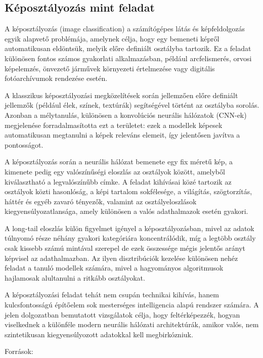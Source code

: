         \subsection{Képosztályozás mint feladat}
            A képosztályozás (image classification) a számítógépes látás és képfeldolgozás egyik alapvető problémája, amelynek célja, hogy egy bemeneti képről automatikusan eldöntsük, melyik előre definiált osztályba tartozik. Ez a feladat különösen fontos számos gyakorlati alkalmazásban, például arcfelismerés, orvosi képelemzés, önvezető járművek környezeti értelmezése vagy digitális fotóarchívumok rendezése esetén.

            A klasszikus képosztályozási megközelítések során jellemzően előre definiált jellemzők (például élek, színek, textúrák) segítségével történt az osztályba sorolás. Azonban a mélytanulás, különösen a konvolúciós neurális hálózatok (CNN-ek) megjelenése forradalmasította ezt a területet: ezek a modellek képesek automatikusan megtanulni a képek releváns elemeit, így jelentősen javítva a pontosságot.
            
            A képosztályozás során a neurális hálózat bemenete egy fix méretű kép, a kimenete pedig egy valószínűségi eloszlás az osztályok között, amelyből kiválasztható a legvalószínűbb címke. A feladat kihívásai közé tartozik az osztályok közti hasonlóság, a képi tartalom sokfélesége, a világítás, szögtorzítás, háttér és egyéb zavaró tényezők, valamint az osztályeloszlások kiegyensúlyozatlansága, amely különösen a valós adathalmazok esetén gyakori.
            
            A long-tail eloszlás külön figyelmet igényel a képosztályozásban, mivel az adatok túlnyomó része néhány gyakori kategóriára koncentrálódik, míg a legtöbb osztály csak kissebb számú mintával szerepel de ezek összessége mégis jelentős arányt képvisel az adathalmazban. Az ilyen disztribúciók kezelése különösen nehéz feladat a tanuló modellek számára, mivel a hagyományos algoritmusok hajlamosak alultanulni a ritkább osztályokat.
            
            A képosztályozási feladat tehát nem csupán technikai kihívás, hanem kulcsfontosságú építőelem sok mesterséges intelligencia alapú rendszer számára. A jelen dolgozatban bemutatott vizsgálatok célja, hogy feltérképezzék, hogyan viselkednek a különféle modern neurális hálózati architektúrák, amikor valós, nem szintetikusan kiegyensúlyozott adatokkal kell megbirkózniuk. 
            \begin{flushright}
                \small
                Források: \cite{article_cnn_image_class} \cite{article_Photo_Content_Classification} \cite{article_cnn_metrics}
            \end{flushright}
            

